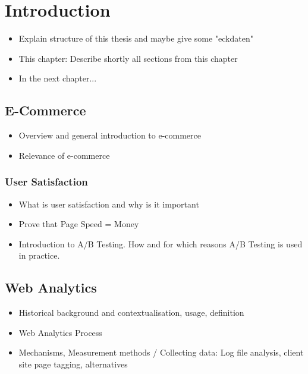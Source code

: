 \chapter{Introduction}

\begin{itemize}
	\item Explain structure of this thesis and maybe give some "eckdaten"
	\item This chapter: Describe shortly all sections from this chapter
	\item In the next chapter...
\end{itemize}

\section{E-Commerce}

\begin{itemize}
\item Overview and general introduction to e-commerce
\item Relevance of e-commerce
\end{itemize}


\subsection{User Satisfaction}

\begin{itemize}
\item What is user satisfaction and why is it important
\item Prove that Page Speed = Money
\item Introduction to A/B Testing. How and for which reasons A/B Testing is used in practice.
\end{itemize}







\section{Web Analytics}

\begin{itemize}
\item Historical background and contextualisation, usage, definition
\item Web Analytics Process
\item Mechanisms, Measurement methods / Collecting data: Log file analysis, client site page tagging, alternatives
\end{itemize}


